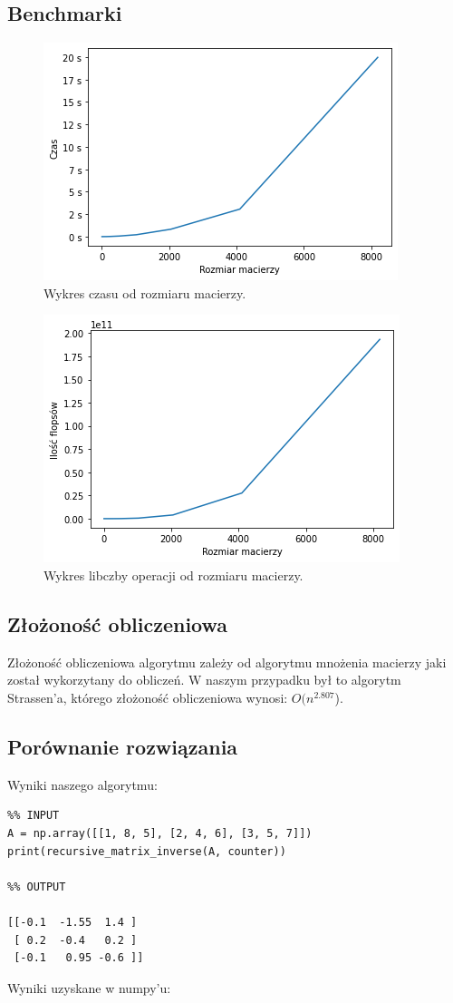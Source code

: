 \documentclass{article}
\begin{document}
\subsection{Benchmarki}


\begin{figure}[H]
    \centering
  \includegraphics[width=0.6\linewidth]{img/inverse_time.png}
  \caption{Wykres czasu od rozmiaru macierzy.}
\end{figure}

\begin{figure}[H]
    \centering
  \includegraphics[width=0.6\linewidth]{img/inverse_flops.png}
  \caption{Wykres libczby operacji od rozmiaru macierzy.}
\end{figure}


\subsection{Złożoność obliczeniowa}
\qquad Złożoność obliczeniowa algorytmu zależy od algorytmu mnożenia macierzy jaki został wykorzytany do obliczeń. W naszym przypadku był to algorytm Strassen'a, którego złożoność obliczeniowa wynosi: $O(n^{2.807}$).
\subsection{Porównanie rozwiązania}

Wyniki naszego algorytmu: \\
\begin{lstlisting}
%% INPUT
A = np.array([[1, 8, 5], [2, 4, 6], [3, 5, 7]])
print(recursive_matrix_inverse(A, counter))

%% OUTPUT

[[-0.1  -1.55  1.4 ]
 [ 0.2  -0.4   0.2 ]
 [-0.1   0.95 -0.6 ]]
\end{lstlisting} 
\newline
Wyniki uzyskane w numpy'u: \\
\end{document}

